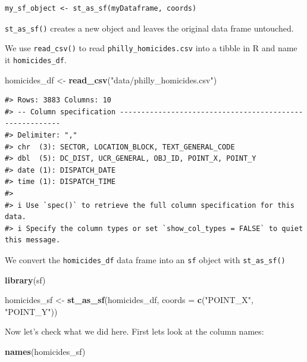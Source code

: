 \documentclass[
]{book}
\newenvironment{Shaded}{\begin{snugshade}}{\end{snugshade}}
\newcommand{\AttributeTok}[1]{\textcolor[rgb]{0.13,0.29,0.53}{#1}}
\newcommand{\FunctionTok}[1]{\textcolor[rgb]{0.13,0.29,0.53}{\textbf{#1}}}
\newcommand{\NormalTok}[1]{#1}
\newcommand{\OtherTok}[1]{\textcolor[rgb]{0.56,0.35,0.01}{#1}}
\newcommand{\StringTok}[1]{\textcolor[rgb]{0.31,0.60,0.02}{#1}}
\begin{document}
\begin{verbatim}
my_sf_object <- st_as_sf(myDataframe, coords)
\end{verbatim}

\texttt{st\_as\_sf()} creates a new object and leaves the original data frame untouched.

We use \texttt{read\_csv()} to read \texttt{philly\_homicides.csv} into a tibble in R and name it \texttt{homicides\_df}.

\begin{Shaded}
\begin{Highlighting}[]
\NormalTok{homicides\_df }\OtherTok{\textless{}{-}} \FunctionTok{read\_csv}\NormalTok{(}\StringTok{"data/philly\_homicides.csv"}\NormalTok{)}
\end{Highlighting}
\end{Shaded}

\begin{verbatim}
#> Rows: 3883 Columns: 10
#> -- Column specification --------------------------------------------------------
#> Delimiter: ","
#> chr  (3): SECTOR, LOCATION_BLOCK, TEXT_GENERAL_CODE
#> dbl  (5): DC_DIST, UCR_GENERAL, OBJ_ID, POINT_X, POINT_Y
#> date (1): DISPATCH_DATE
#> time (1): DISPATCH_TIME
#> 
#> i Use `spec()` to retrieve the full column specification for this data.
#> i Specify the column types or set `show_col_types = FALSE` to quiet this message.
\end{verbatim}

We convert the \texttt{homicides\_df} data frame into an \texttt{sf} object with \texttt{st\_as\_sf()}

\begin{Shaded}
\begin{Highlighting}[]
\FunctionTok{library}\NormalTok{(sf)}

\NormalTok{homicides\_sf }\OtherTok{\textless{}{-}} \FunctionTok{st\_as\_sf}\NormalTok{(homicides\_df, }\AttributeTok{coords =} \FunctionTok{c}\NormalTok{(}\StringTok{"POINT\_X"}\NormalTok{, }\StringTok{"POINT\_Y"}\NormalTok{))}
\end{Highlighting}
\end{Shaded}

Now let's check what we did here. First lets look at the column names:

\begin{Shaded}
\begin{Highlighting}[]
\FunctionTok{names}\NormalTok{(homicides\_sf)}
\end{Highlighting}
\end{Shaded}
\end{document}
